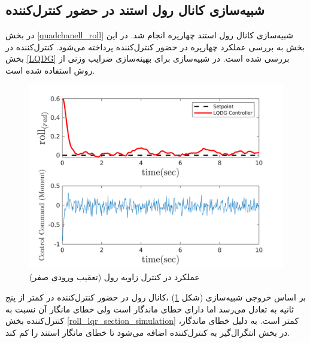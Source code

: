 \subsection{شبیه‌سازی کانال رول استند در حضور کنترل‌کننده }\label{roll_LQDG_section_simulation}
در بخش
\ref{quadchanell_roll}
شبیه‌سازی کانال رول استند چهارپره انجام شد. در این بخش به بررسی عملکرد چهارپره در حضور کنترل‌کننده  پرداخته می‌شود. کنترل‌کننده  در بخش
\ref{LQDG}
بررسی شده است.
 در شبیه‌سازی برای بهینه‌سازی ضرایب وزنی  از روش
 \cite{Karimi2010}
استفاده شده است.
\begin{figure}[H]\label{lqdg_roll_fig_simulation}
	\includegraphics[width=12cm]{../Figures/MIL/LQDG/Roll/lqdg_roll.png}
	\centering
	\caption{عملكرد  در کنترل زاويه رول (تعقیب ورودی صفر)}
\end{figure}
بر اساس خروجی شبیه‌سازی (شکل
\ref{lqdg_roll_fig_simulation})
،کانال رول در حضور کنترل‌کننده  در کمتر از پنج ثانیه به تعادل می‌رسد اما دارای خطای ماندگار است ولی خطای مانگار آن نسبت به کنترل‌کننده بخش
\ref{roll_lqr_section_simulation}
کمتر است. به دلیل خطای ماندگار، در بخش
انتگرال‌گیر به کنترل‌کننده اضافه می‌شود تا خطای مانگار استند را کم کند.
